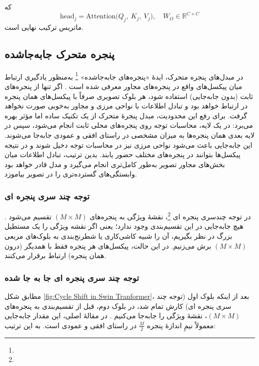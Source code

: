 که 
\[
\text{head}_j = \mathrm{Attention}\bigl(Q_j,\ K_j,\ V_j\bigr),
\quad 
W_O \in \mathbb{R}^{C \times C}
\]
ماتریس ترکیب نهایی است.

\subsection{پنجره متحرک جابه‌جاشده}
در مبدل‌های پنجره متحرک، ایدهٔ «پنجره‌های جابه‌جاشده» \footnote{} به‌منظور یادگیری ارتباط میان پیکسل‌های واقع در پنجره‌های مجاور معرفی شده است \cite{liu2021swintransformer}. اگر تنها از پنجره‌های ثابت (بدون جابه‌جایی) استفاده شود، هر بلوک تصویری صرفاً با پیکسل‌های همان پنجره در ارتباط خواهد بود و تبادل اطلاعات با نواحی مرزی و مجاور به‌خوبی صورت نخواهد گرفت. برای رفع این محدودیت، مبدل پنجرهٔ متحرک از یک تکنیک ساده اما مؤثر بهره می‌برد: در یک لایه، محاسبات توجه روی پنجره‌های محلی ثابت انجام می‌شود، سپس در لایه بعدی همان پنجره‌ها به میزان مشخصی در راستای افقی و عمودی جابه‌جا می‌شوند. این جابه‌جایی باعث می‌شود نواحی مرزی نیز در محاسبات توجه دخیل شوند و در نتیجه پیکسل‌ها بتوانند در پنجره‌های مختلف حضور یابند. بدین ترتیب، تبادل اطلاعات میان بخش‌های مجاور تصویر به‌طور کامل‌تری انجام می‌گیرد و مدل قادر خواهد بود وابستگی‌های گسترده‌تری را در تصویر بیاموزد.


\subsubsection{توجه چند سری پنجره ای}
در توجه چندسری پنجره ای \footnote{}، نقشهٔ ویژگی به پنجره‌های \(\displaystyle (M \times M)\) تقسیم می‌شود \cite{liu2021swintransformer}.
هیچ جابه‌جایی در این تقسیم‌بندی وجود ندارد؛ یعنی اگر نقشه ویژگی را یک مستطیل بزرگ در نظر بگیریم،
آن را شبیه کاشی‌کاری یا شطرنج‌بندی به بلوک‌های مربعی \(\displaystyle (M \times M)\) برش می‌زنیم.
در این حالت، پیکسل‌های هر پنجره فقط با همدیگر (درون همان پنجره) ارتباط برقرار می‌کنند.

\subsubsection{توجه چند سری پنجره ای جا به جا شده}
مطابق شکل \ref{fig:Cycle Shift in Swin Tranformer}، بعد از اینکه بلوک اول (توجه چند سری پنجره ای) کارش تمام شد، در بلوک دوم، قبل از تقسیم‌بندی به پنجره‌های 
\(\displaystyle (M \times M)\)، نقشهٔ ویژگی را جابه‌جا  می‌کنیم \cite{liu2021swintransformer}.
در مقالهٔ اصلی، این مقدار جابه‌جایی معمولاً نیمِ اندازهٔ پنجره 
\(\displaystyle \frac{M}{2}\)
در راستای افقی و عمودی است. به این ترتیب:


